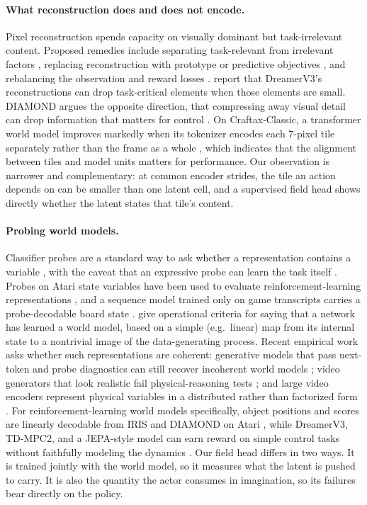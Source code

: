 \paragraph{What reconstruction does and does not encode.}
Pixel reconstruction spends capacity on visually dominant but task-irrelevant content.
Proposed remedies include separating task-relevant from irrelevant factors \citep{fu2021tia}, replacing reconstruction with prototype or predictive objectives \citep{deng2022dreamerpro,burchi2024mudreamer}, and rebalancing the observation and reward losses \citep{ma2024harmonydream}.
\citet{burchi2024mudreamer} report that DreamerV3's reconstructions can drop task-critical elements when those elements are small.
DIAMOND argues the opposite direction, that compressing away visual detail can drop information that matters for control \citep{alonso2024diamond}.
On Craftax-Classic, a transformer world model improves markedly when its tokenizer encodes each 7-pixel tile separately rather than the frame as a whole \citep{dedieu2025improving}, which indicates that the alignment between tiles and model units matters for performance.
Our observation is narrower and complementary: at common encoder strides, the tile an action depends on can be smaller than one latent cell, and a supervised field head shows directly whether the latent states that tile's content.

\paragraph{Probing world models.}
Classifier probes are a standard way to ask whether a representation contains a variable \citep{alain2017probes}, with the caveat that an expressive probe can learn the task itself \citep{hewitt2019control}.
Probes on Atari state variables have been used to evaluate reinforcement-learning representations \citep{anand2019atariari}, and a sequence model trained only on game transcripts carries a probe-decodable board state \citep{li2023othello}.
\citet{li2025worldmodeldef} give operational criteria for saying that a network has learned a world model, based on a simple (e.g.\ linear) map from its internal state to a nontrivial image of the data-generating process.
Recent empirical work asks whether such representations are coherent: generative models that pass next-token and probe diagnostics can still recover incoherent world models \citep{vafa2024evaluating}; video generators that look realistic fail physical-reasoning tests \citep{motamed2026physicsiq}; and large video encoders represent physical variables in a distributed rather than factorized form \citep{joseph2026physics}.
For reinforcement-learning world models specifically, object positions and scores are linearly decodable from IRIS and DIAMOND on Atari \citep{zhang2026probing}, while DreamerV3, TD-MPC2, and a JEPA-style model can earn reward on simple control tasks without faithfully modeling the dynamics \citep{gonzalezlaiz2026limits}.
Our field head differs in two ways. It is trained jointly with the world model, so it measures what the latent is pushed to carry. It is also the quantity the actor consumes in imagination, so its failures bear directly on the policy.

